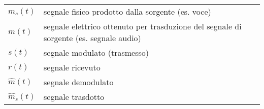 \begin{tabular}{ll}
    $m_s(t)$       & segnale fisico prodotto dalla sorgente (es. voce)                                      \\
    $m(t)$         & segnale elettrico ottenuto per trasduzione del segnale di sorgente (es. segnale audio) \\
    $s(t)$         & segnale modulato (trasmesso)                                                           \\
    $r(t)$         & segnale ricevuto                                                                       \\
    $\hat{m}(t)$   & segnale demodulato                                                                     \\
    $\hat{m}_s(t)$ & segnale trasdotto                                                                      \\
\end{tabular}
\\
